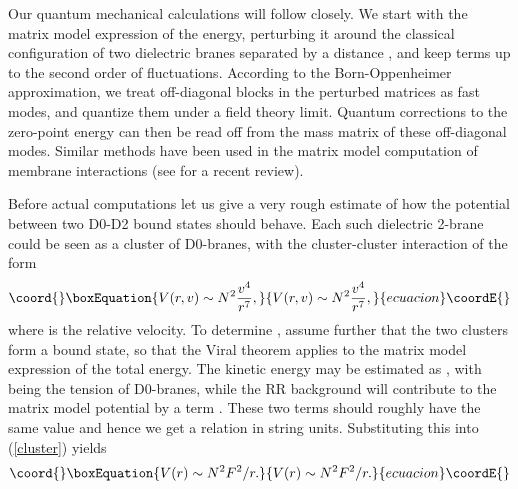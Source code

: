 \documentclass[a4paper,12pt]{article}
\begin{document}
Our quantum mechanical calculations will follow \cite{AB} closely. We start with the matrix model expression of the energy, perturbing it around the classical configuration of two dielectric branes separated by a distance \coordHE{}, and keep terms up to the second order of fluctuations. According to the Born-Oppenheimer approximation, we treat off-diagonal blocks in the perturbed matrices as fast modes, and quantize them under a field theory limit. Quantum corrections to the zero-point energy can then be read off from the mass matrix of these off-diagonal modes. Similar methods have been used in the matrix model computation of membrane interactions \cite{AB} \cite{LM} \cite{TR97} (see \cite{Taylor} for a recent review).

Before actual computations let us give a very rough estimate of how the potential \coordHE{} between two D0-D2 bound states should behave. Each such dielectric 2-brane could be seen as a cluster of \coordHE{} D0-branes, with the cluster-cluster interaction of the form \cite{DKPS}
\begin{equation}\coord{}\boxEquation{
V(r,v)\sim N^{2}\frac{v^{4}}{r^{7}},
\label{cluster}
}{
V(r,v)\sim N^{2}\frac{v^{4}}{r^{7}},
}{ecuacion}\coordE{}\end{equation}
where \coordHE{} is the relative velocity. To determine \coordHE{}, assume further that the two clusters form a bound state, so that the Viral theorem applies to the matrix model expression of the total energy. The kinetic energy may be estimated as \coordHE{}, with \coordHE{} being the tension of D0-branes, while the RR background \coordHE{} will contribute to the matrix model potential by a term \coordHE{}. These two terms should roughly have the same value and hence we get a relation \coordHE{} in string units. Substituting this into (\ref{cluster}) yields
\begin{equation}\coord{}\boxEquation{
V(r)\sim N^{2}F^{2}/r.
\label{1/r}
}{
V(r)\sim N^{2}F^{2}/r.
}{ecuacion}\coordE{}\end{equation}
\end{document}
